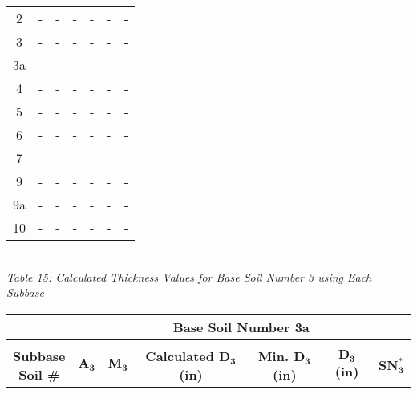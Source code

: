 \documentclass{article}
\begin{document}
\begin{center}
\begin{spacing}{1.6}
\begin{tabular}{|c|cccccc|}
                                            2       & -     & -    & -    & -                    & -              & -               \\
                                            3       & -     & -    & -    & -                    & -              & -               \\
                                            3a      & -     & -    & -    & -                    & -              & -               \\
                                            4       & -     & -    & -    & -                    & -              & -               \\
                                            5       & -     & -    & -    & -                    & -              & -               \\
                                            6       & -     & -    & -    & -                    & -              & -               \\
                                            7       & -     & -    & -    & -                    & -              & -               \\
                                            9       & -     & -    & -    & -                    & -              & -               \\
                                            9a      & -     & -    & -    & -                    & -              & -               \\
                                            10      & -     & -    & -    & -                    & -              & -               \\\hline
        \end{tabular}
        \vspace{3mm}
        \emph{\\Table 15: Calculated Thickness Values for Base Soil Number 3 using Each Subbase\\}
        \vspace{7mm}
        \begin{tabular}{|c|cccccc|}
            \hline    
            \multicolumn{1}{|l}{}                     & \multicolumn{6}{c|}{\textbf{Base Soil Number 3a}}                                              \\\hline
            &&&&&&\\
             \shortstack[c]{\textbf{Subbase}\\\textbf{Soil \#}} & $\bm{A_3}$ & $\bm{M_3}$  & \textbf{Calculated $\bm{D_3}$ (in)} & \textbf{Min. $\bm{D_3}$ (in)} & \textbf{$\bm{D_3}$ (in)} & $\bm{SN_3^*}$  \\\hline

\end{tabular}
\end{spacing}
\end{center}
\end{document}
